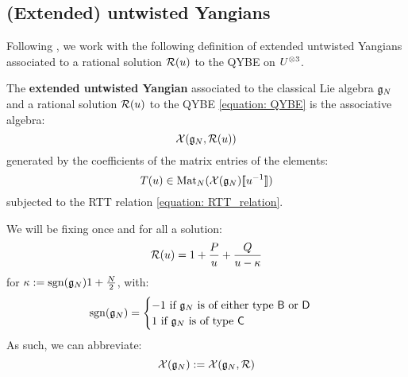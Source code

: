         \subsection{(Extended) untwisted Yangians}
            Following \cite[Definition 2.1]{guay_regelskis_twisted_yangians_for_symmetric_pairs_of_types_BCD}, we work with the following definition of extended untwisted Yangians associated to a rational solution $\mathcal{R}(u)$ to the QYBE on $U^{\tensor 3}$.
            \begin{definition} \label{def: extended_untwisted_yangians}
                The \textbf{extended untwisted Yangian} associated to the classical Lie algebra $\mathfrak{g}_N$ and a rational solution $\mathcal{R}(u)$ to the QYBE \eqref{equation: QYBE} is the associative algebra:
                    $$\mathcal{X}(\mathfrak{g}_N, \mathcal{R}(u))$$
                generated by the coefficients of the matrix entries of the elements:
                    $$T(u) \in \mathrm{Mat}_N( \mathcal{X}(\mathfrak{g}_N)[\![u^{-1}]\!] )$$
                subjected to the RTT relation \eqref{equation: RTT_relation}.
            \end{definition}

            We will be fixing once and for all a solution:
                $$\mathcal{R}(u) = 1 + \frac{P}{u} + \frac{Q}{u - \kappa}$$
            for $\kappa := \operatorname{sgn}(\mathfrak{g}_N) 1 + \frac{N}{2}$, with:
                \begin{equation} \label{equation: BCD_signature}
                    \operatorname{sgn}(\mathfrak{g}_N) =
                    \begin{cases}
                        \text{$-1$ if $\mathfrak{g}_N$ is of either type $\mathsf{B}$ or $\mathsf{D}$}
                        \\
                        \text{$1$ if $\mathfrak{g}_N$ is of type $\mathsf{C}$}
                    \end{cases}
                \end{equation}
            As such, we can abbreviate:
                $$\mathcal{X}(\mathfrak{g}_N) := \mathcal{X}(\mathfrak{g}_N, \mathcal{R})$$

